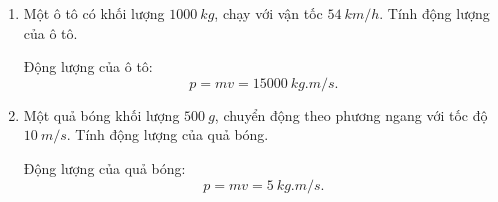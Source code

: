 \begin{enumerate}[label=\bfseries Câu \arabic*:]
		\item {}
	
	
	{
		Một ô tô có khối lượng $\SI{1000}{kg}$, chạy với vận tốc $\SI{54}{km/h}$. Tính động lượng của ô tô.
	}
	
	\hideall
	{	
		Động lượng của ô tô:
		$$p = mv = \SI{15000}{kg.m/s}.$$
	}
	\item {}
	
	
	{
		Một quả bóng khối lượng $\SI{500}{g}$, chuyển động theo phương ngang với tốc độ $\SI{10}{m/s}$. Tính động lượng của quả bóng.
	}
	
	\hideall
	{	
		Động lượng của quả bóng: $$p=mv =\SI{5}{kg.m/s}.$$
	}

\end{enumerate}